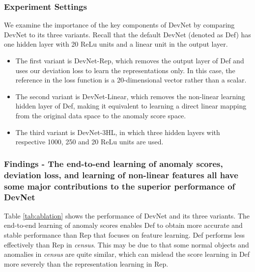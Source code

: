 \documentclass[sigconf]{acmart}
\begin{document}
\subsubsection{Experiment Settings}
We examine the importance of the key components of DevNet by comparing DevNet to its three variants. Recall that the default DevNet (denoted as Def) has one hidden layer with 20 ReLu units and a linear unit in the output layer. 
\begin{itemize}
    \item The first variant is DevNet-Rep, which removes the output layer of Def and uses our deviation loss to learn the representations only. In this case, the reference in the loss function is a 20-dimensional vector rather than a scalar.
    \item The second variant is DevNet-Linear, which removes the non-linear learning hidden layer of Def, making it equivalent to learning a direct linear mapping from the original data space to the anomaly score space.
    \item The third variant is DevNet-3HL, in which three hidden layers with respective 1000, 250 and 20 ReLu units are used.
\end{itemize}
 

\subsubsection{Findings - The end-to-end learning of anomaly scores, deviation loss, and learning of non-linear features all have some major contributions to the superior performance of DevNet}

Table \ref{tab:ablation} shows the performance of DevNet and its three variants. The end-to-end learning of anomaly scores enables Def to obtain more accurate and stable performance than Rep that focuses on feature learning. Def performs less effectively than Rep in \textit{census}. This may be due to that some normal objects and anomalies in \textit{census} are quite similar, which can mislead the score learning in Def more severely than the representation learning in Rep.
\end{document}
